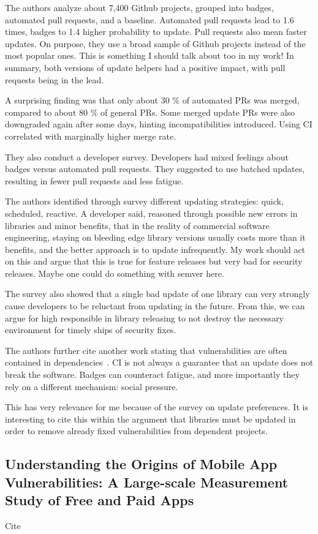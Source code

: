 The authors analyze about 7,400 Github projects, grouped into badges, automated pull requests, and a baseline.
Automated pull requests lead to 1.6 times, badges to 1.4 higher probability to update.
Pull requests also mean faster updates.
On purpose, they use a broad sample of Github projects instead of the most popular ones.
This is something I should talk about too in my work!
In summary, both versions of update helpers had a positive impact, with pull requests being in the lead.

A surprising finding was that only about 30 \% of automated PRs was merged, compared to about 80 \% of general PRs.
Some merged update PRs were also downgraded again after some days, hinting incompatibilities introduced.
Using CI correlated with marginally higher merge rate.

They also conduct a developer survey.
Developers had mixed feelings about badges versus automated pull requests.
They suggested to use batched updates, resulting in fewer pull requests and less fatigue.

The authors identified through survey different updating strategies: quick, scheduled, reactive.
A developer said, reasoned through possible new errors in libraries and minor benefits, that in the reality of commercial
software engineering, staying on bleeding edge library versions usually costs more than it benefits, and the better
approach is to update infrequently.
My work should act on this and argue that this is true for feature releases but very bad for security releases.
Maybe one could do something with semver here.

The survey also showed that a single bad update of one library can very strongly cause developers to be reluctant from
updating in the future.
From this, we can argue for high responsible in library releasing to not destroy the necessary environment for timely
ships of security fixes.

The authors further cite another work stating that vulnerabilities are often contained in dependencies~\cite{xia2014}.
CI is not always a guarantee that an update does not break the software.
Badges can counteract fatigue, and more importantly they rely on a different mechanism: social pressure.

This has very relevance for me because of the survey on update preferences.
It is interesting to cite this within the argument that libraries must be updated in order to remove already fixed
vulnerabilities from dependent projects.



\subsection{Understanding the Origins of Mobile App Vulnerabilities: A Large-scale Measurement Study of Free and Paid Apps}
\label{subsec:understanding-the-origins-of-mobile-app-vulnerabilities:-a-large-scale-measurement-study-of-free-and-paid-apps}

Cite~\cite{watanabe2017}
